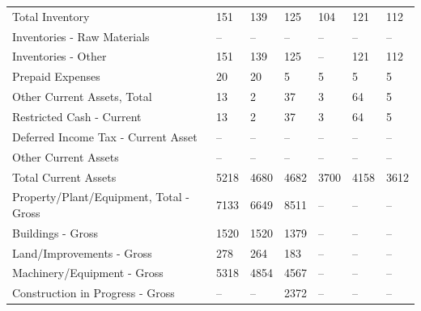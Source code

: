 \documentclass[grad,numbers]{coppe}
\begin{document}
\begin{longtable}[t]{lllllll}
  \hspace{1em}Total Inventory & 151 & 139 & 125 & 104 & 121 & 112\\
  \hspace{1em}\hspace{1em}Inventories - Raw Materials & -- & -- & -- & -- & -- & --\\
  \hspace{1em}\hspace{1em}Inventories - Other & 151 & 139 & 125 & -- & 121 & 112\\
  \hspace{1em}Prepaid Expenses & 20 & 20 & 5 & 5 & 5 & 5\\
  \hspace{1em}Other Current Assets, Total & 13 & 2 & 37 & 3 & 64 & 5\\
  \hspace{1em}\hspace{1em}Restricted Cash - Current & 13 & 2 & 37 & 3 & 64 & 5\\
  \hspace{1em}\hspace{1em}Deferred Income Tax - Current Asset & -- & -- & -- & -- & -- & --\\
  \hspace{1em}\hspace{1em}Other Current Assets & -- & -- & -- & -- & -- & --\\
  \hspace{1em}Total Current Assets & 5218 & 4680 & 4682 & 3700 & 4158 & 3612\\
  \hspace{1em}Property/Plant/Equipment, Total - Gross & 7133 & 6649 & 8511 & -- & -- & --\\
  \hspace{1em}\hspace{1em}Buildings - Gross & 1520 & 1520 & 1379 & -- & -- & --\\
  \hspace{1em}\hspace{1em}Land/Improvements - Gross & 278 & 264 & 183 & -- & -- & --\\
  \hspace{1em}\hspace{1em}Machinery/Equipment - Gross & 5318 & 4854 & 4567 & -- & -- & --\\
  \hspace{1em}\hspace{1em}Construction in Progress - Gross & -- & -- & 2372 & -- & -- & --\\

\end{longtable}
\end{document}
